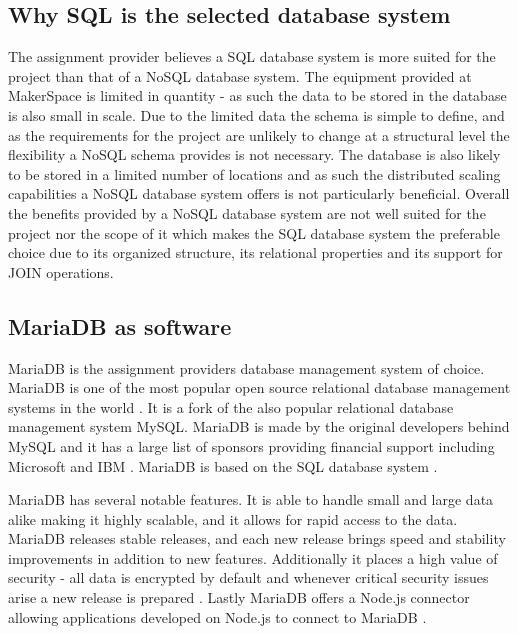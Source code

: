 \subsection{Why SQL is the selected database system}
The assignment provider believes a SQL database system is more suited for the project than that of a NoSQL database system.
The equipment provided at MakerSpace is limited in quantity - as such the data to be stored in the database is also small in scale.
Due to the limited data the schema is simple to define, and as the requirements for the project are unlikely to change at a structural level the flexibility a NoSQL schema provides is not necessary.
The database is also likely to be stored in a limited number of locations and as such the distributed scaling capabilities a NoSQL database system offers is not particularly beneficial.
Overall the benefits provided by a NoSQL database system are not well suited for the project nor the scope of it which makes the SQL database system the preferable choice due to its organized structure, its relational properties and its support for JOIN operations.

\subsection{MariaDB as software}
MariaDB is the assignment providers database management system of choice.
MariaDB is one of the most popular\cite{mariadb-foundation-about} open source relational database management systems in the world \cite{mariadb-about}.
It is a fork of the also popular relational database management system MySQL\cite{mysql-about}.
MariaDB is made by the original developers behind MySQL \cite{mariadb-foundation-about} and it has a large list of sponsors providing financial support including Microsoft and IBM \cite{mariadb-sponsors}.
MariaDB is based on the SQL database system \cite{mariadb-about-searchdatamanagement}.

MariaDB has several notable features.
It is able to handle small and large data alike making it highly scalable, and it allows for rapid access to the data.
MariaDB releases stable releases, and each new release brings speed and stability improvements in addition to new features.
Additionally it places a high value of security - all data is encrypted by default and whenever critical security issues arise a new release is prepared \cite{mariadb-about}.
Lastly MariaDB offers a Node.js connector allowing applications developed on Node.js to connect to MariaDB \cite{mariadb-node-connector}.

